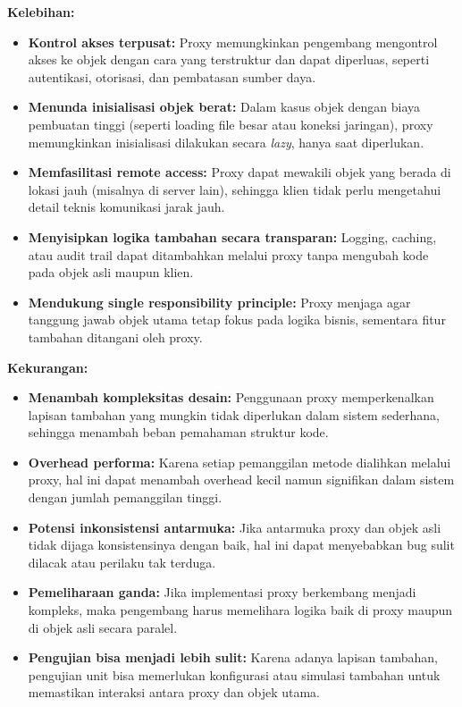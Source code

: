 \textbf{Kelebihan:}
\begin{itemize}
	\item \textbf{Kontrol akses terpusat:} Proxy memungkinkan pengembang mengontrol akses ke objek dengan cara yang terstruktur dan dapat diperluas, seperti autentikasi, otorisasi, dan pembatasan sumber daya.
	
	\item \textbf{Menunda inisialisasi objek berat:} Dalam kasus objek dengan biaya pembuatan tinggi (seperti loading file besar atau koneksi jaringan), proxy memungkinkan inisialisasi dilakukan secara \textit{lazy}, hanya saat diperlukan.
	
	\item \textbf{Memfasilitasi remote access:} Proxy dapat mewakili objek yang berada di lokasi jauh (misalnya di server lain), sehingga klien tidak perlu mengetahui detail teknis komunikasi jarak jauh.
	
	\item \textbf{Menyisipkan logika tambahan secara transparan:} Logging, caching, atau audit trail dapat ditambahkan melalui proxy tanpa mengubah kode pada objek asli maupun klien.
	
	\item \textbf{Mendukung single responsibility principle:} Proxy menjaga agar tanggung jawab objek utama tetap fokus pada logika bisnis, sementara fitur tambahan ditangani oleh proxy.
\end{itemize}

\textbf{Kekurangan:}
\begin{itemize}
	\item \textbf{Menambah kompleksitas desain:} Penggunaan proxy memperkenalkan lapisan tambahan yang mungkin tidak diperlukan dalam sistem sederhana, sehingga menambah beban pemahaman struktur kode.
	
	\item \textbf{Overhead performa:} Karena setiap pemanggilan metode dialihkan melalui proxy, hal ini dapat menambah overhead kecil namun signifikan dalam sistem dengan jumlah pemanggilan tinggi.
	
	\item \textbf{Potensi inkonsistensi antarmuka:} Jika antarmuka proxy dan objek asli tidak dijaga konsistensinya dengan baik, hal ini dapat menyebabkan bug sulit dilacak atau perilaku tak terduga.
	
	\item \textbf{Pemeliharaan ganda:} Jika implementasi proxy berkembang menjadi kompleks, maka pengembang harus memelihara logika baik di proxy maupun di objek asli secara paralel.
	
	\item \textbf{Pengujian bisa menjadi lebih sulit:} Karena adanya lapisan tambahan, pengujian unit bisa memerlukan konfigurasi atau simulasi tambahan untuk memastikan interaksi antara proxy dan objek utama.
\end{itemize}

